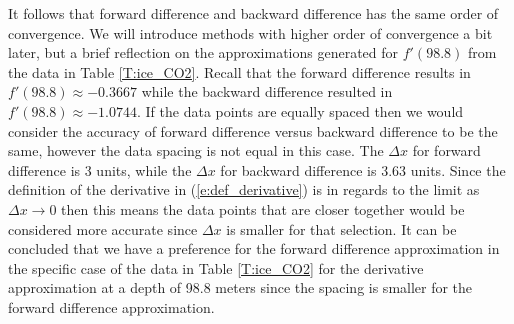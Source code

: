 \documentclass[twoside]{article}
\def\ds{\displaystyle}
\begin{document}
It follows that forward difference and backward difference has the same order of convergence. We will introduce methods with higher order of convergence a bit later, but a brief reflection on the approximations generated for $f'(98.8)$ from the data in Table \ref{T:ice_CO2}. Recall that the forward difference results in $f'(98.8)\approx -0.3667$ while the backward difference resulted in $f'(98.8)\approx -1.0744$. If the data points are equally spaced then we would consider the accuracy of forward difference versus backward difference to be the same, however the data spacing is not equal in this case. The $\Delta x$ for forward difference is 3 units, while the $\ds \Delta x$ for backward difference is 3.63 units. Since the definition of the derivative in (\ref{e:def_derivative}) is in regards to the limit as $\Delta x \rightarrow 0$ then this means the data points that are closer together would be considered more accurate since $\Delta x$ is smaller for that selection. It can be concluded that we have a preference for the forward difference approximation in the specific case of the data in Table \ref{T:ice_CO2} for the derivative approximation at a depth of 98.8 meters since the spacing is smaller for the forward difference approximation. 
\end{document}
